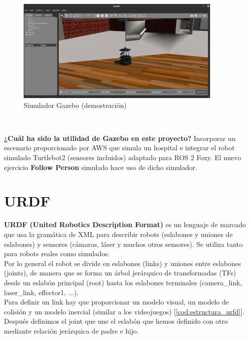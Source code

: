 \begin{figure} [H]
  \begin{center}
    \includegraphics[width=10cm]{imagenes/simulacion-gazebo.png}
  \end{center}
  \caption{Simulador Gazebo (demostración)}
  \label{fig:simulador_gazebo}
\end{figure}\

\textbf{¿Cuál ha sido la utilidad de Gazebo en este proyecto?} Incorporar un escenario proporcionado por AWS que simula un hospital e integrar el robot simulado Turtlebot2 (sensores incluidos) adaptado para ROS 2 Foxy. El nuevo ejercicio \textbf{Follow Person} simulado hace uso de dicho simulador.\\




\section{URDF}
\label{sec:urdf}

\textbf{URDF (United Robotics Description Format)} es un lenguaje de marcado que usa la gramática de XML para describir robots (eslabones y uniones de eslabones) y sensores (cámaras, láser y muchos otros sensores). Se utiliza tanto para robots reales como simulados.\\

Por lo general el robot se divide en eslabones (links) y uniones entre eslabones (joints), de manera que se forma un árbol jerárquico de transformadas (TFs) desde un eslabón principal (root) hasta los eslabones terminales (camera\_link, laser\_link, effector1, ...).\\

Para definir un link hay que proporcionar un modelo visual, un modelo de colisión y un modelo inercial (similar a los videojuegos) [\ref{cod:estructura_urfd}]. Después definimos el joint que une el eslabón que hemos definido con otro mediante relación jerárquica de padre e hijo.\\

